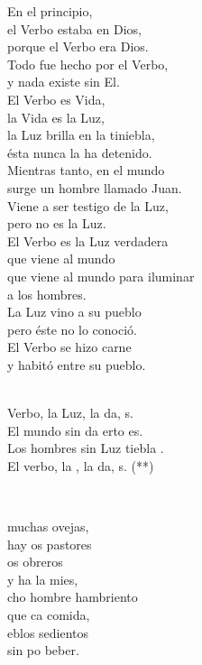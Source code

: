 \documentclass[12pt]{article}
\begin{document}
\begin{multicols*}{2}
\begin{cancion}%
En el principio,\\
el Verbo estaba en Dios,\\
porque el Verbo era Dios.\\
Todo fue hecho por el Verbo,\\
y nada existe sin El.\\
El Verbo es Vida,\\
la Vida es la Luz,\\
la Luz brilla en la tiniebla,\\
ésta nunca la ha detenido.\\
Mientras tanto, en el mundo\\
surge un hombre llamado Juan.\\
Viene a ser testigo de la Luz,\\
pero no es la Luz.\\
El Verbo es la Luz verdadera\\
que viene al mundo\\
que viene al mundo para iluminar\\
a los hombres.\\
La Luz vino a su pueblo\\
pero éste no lo conoció.\\
El Verbo se hizo carne\\
y habitó entre su pueblo.\\\jump\\
	\begin{chorus}%
	Verbo, la Luz, la da, s.\\
	El mundo sin da erto es.\\
	Los hombres sin Luz tiebla .\\
	El verbo, la , la da, s. (**)\\
	\end{chorus}%
	\jump\\
\end{cancion}%

\begin{cancion}%
	 muchas ovejas,\\
	hay os pastores\\
	os obreros\\
	y ha la mies,\\
	cho hombre hambriento\\
	que ca comida,\\
	eblos sedientos \\
	sin po beber.\\
\end{cancion}%


\end{multicols*}
\end{document}
